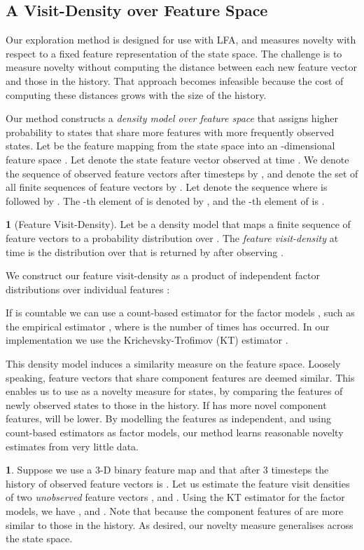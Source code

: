 \documentclass{article}
\theoremstyle{definition}
\newtheorem{defn}{\protect\definitionname}
\theoremstyle{definition}
\newtheorem*{example*}{\protect\examplename}
\theoremstyle{plain}
\theoremstyle{plain}
\theoremstyle{plain}
\providecommand{\definitionname}{Definition}
\providecommand{\examplename}{Example}
\begin{document}
\subsection{A Visit-Density over Feature Space\label{sub:A-Visit-Density-over}}

Our exploration method is designed for use with LFA, and measures
novelty with respect to a fixed feature representation of the state
space. The challenge is to measure novelty without computing the distance
between each new feature vector and those in the history. That approach
becomes infeasible because the cost of computing these distances grows
with the size of the history.

Our method constructs a \emph{density model over feature space }that
assigns higher probability to states that share more features with
more frequently observed states. Let 
be the feature mapping from the state space into an -dimensional
feature space . Let 
denote the state feature vector observed at time . We denote the
sequence of observed feature vectors after  timesteps by ,
and denote the set of all finite sequences of feature vectors by .
Let  denote the sequence where 
is followed by . The -th element of  is
denoted by , and the -th element of 
is . 
\begin{defn}
[Feature Visit-Density]Let 
be a density model\emph{ }that maps a finite sequence of feature vectors
 to a probability distribution
over . The \emph{feature visit-density }
at time  is the distribution over  that is returned
by  after observing . 
\end{defn}
We construct our\emph{ }feature visit-density\emph{ }as a product
of independent factor distributions  over
individual features :

If  is countable we can use a count-based estimator
for the factor models , such as the empirical
estimator , where
 is the number of times  has occurred.
In our implementation we use the Krichevsky-Trofimov (KT) estimator
.

This density model induces a similarity measure on the feature space.
Loosely speaking, feature vectors that share component features are
deemed similar. This enables us to use  as a
novelty measure for states, by comparing the features of newly observed
states to those in the history. If  has more novel
component features,  will be lower. By modelling
the features as independent, and using count-based estimators as factor
models, our method learns reasonable novelty estimates from very little
data. 
\begin{example*}
Suppose we use a 3-D binary feature map and that after 3 timesteps
the history of observed feature vectors is .
Let us estimate the feature visit densities of two \emph{unobserved}
feature vectors , and .
Using the KT estimator for the factor models, we have ,
and .
Note that  because the
component features of  are more similar to those in the
history. As desired, our novelty measure generalises across the state
space.
\end{example*}
\end{document}
